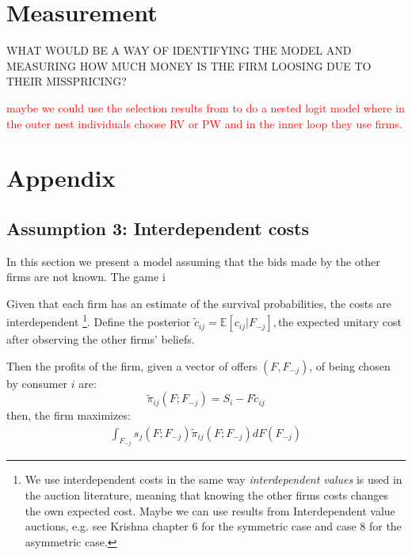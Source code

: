 \documentclass[12pt]{article}
\theoremstyle{plain}
\theoremstyle{plain}
\begin{document}
\section{Measurement} 
WHAT WOULD BE A WAY OF IDENTIFYING THE MODEL AND MEASURING HOW MUCH MONEY IS THE FIRM LOOSING DUE TO THEIR MISSPRICING? 


\textcolor{red}{maybe we could use the selection results from \cite{illanes_retirement_2019} to do a nested logit model where in the outer nest individuals choose RV or PW and in the inner loop they use firms. }   



\newpage
\section*{Appendix}

\subsection{Assumption 3: Interdependent costs}\label{sec:interdependent2}

In this section we present a model assuming that the bids made by the other firms are not known. The game i

Given that each firm has an estimate of the survival probabilities, the costs are interdependent \footnote{We use interdependent costs in the same way \textit{interdependent values} is used in the auction literature, meaning that knowing the other firms costs changes the own expected cost. Maybe we can use results from Interdependent value auctions, e.g. see Krishna chapter 6 for the symmetric case and case 8 for the asymmetric case. }. Define the posterior $\tilde{c}_{ij}=\mathbb{E}\left[c_{ij}|F_{-j}\right],$the expected unitary cost after observing the other firms' beliefs. 

Then the profits of the firm, given a vector of offers $(F, F_{-j})$, of being chosen by consumer $i$ are: 
\begin{equation}
\tilde{\pi}_{ij}(F;F_{-j})=S_{i}-F\tilde{c}_{ij}
\end{equation}
then, the firm maximizes: 
\begin{align*}
    \int_{F_{-j}} s_j(F; F_{-j})\tilde{\pi}_{ij}(F;F_{-j}) dF(F_{-j})
\end{align*}
\end{document}
